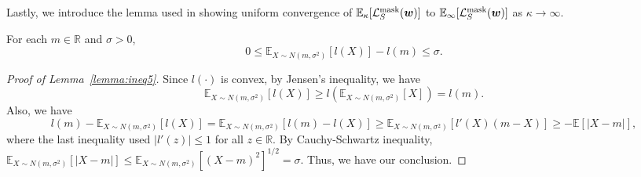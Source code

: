 Lastly, we introduce the lemma used in showing uniform convergence of $\mathbb{E}_\kappa[\mathcal{L}_S^\mathrm{mask}({\bm{w}})]$ to $\mathbb{E}_\infty[\mathcal{L}_S^\mathrm{mask}({\bm{w}})]$ as $\kappa \rightarrow \infty$.
\begin{lemma}\label{lemma:ineq5}
For each $m \in \mathbb{R}$ and $\sigma >0$, 
\begin{equation*}
0 \leq \mathbb{E}_{X \sim N(m, \sigma^2)}[l(X)] - l(m) \leq \sigma.
\end{equation*}
\end{lemma}
\begin{proof}[Proof of Lemma~\ref{lemma:ineq5}]
Since $l(\cdot)$ is convex, by Jensen's inequality, we have
\begin{equation*}
    \mathbb{E}_{X \sim N(m, \sigma^2)}[l(X)] \geq l(\mathbb{E}_{X \sim N(m, \sigma^2)}[X])  = l(m).
\end{equation*}
Also,  we have
\begin{equation*}
    l(m) - \mathbb{E}_{X \sim N(m, \sigma^2)}[l(X)] = \mathbb{E}_{X \sim N(m, \sigma^2)}[l(m)-l(X)] \geq \mathbb{E}_{X \sim N(m, \sigma^2)}[l'(X) (m-X)] \geq -\mathbb{E}[|X-m|],
\end{equation*}
where the last inequality used $|l'(z)|\leq 1$ for all $z \in \mathbb{R}$.
By Cauchy-Schwartz inequality, $\mathbb{E}_{X \sim N(m, \sigma^2)}[|X-m|] \leq \mathbb{E}_{X \sim N(m, \sigma^2)}[(X-m)^2]^{1/2} = \sigma$. Thus, we have our conclusion.
\end{proof}

